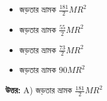 \documentclass[12pt, a4paper]{article}
\begin{document}
\begin{itemize}[label={}, leftmargin=1cm, itemsep=0.5em]
    \item[\textbf{A)}] জড়তার ভ্রামক $\frac{181}{2} M R^2$
    \item[\textbf{B)}] জড়তার ভ্রামক $\frac{55}{2} M R^2$
    \item[\textbf{C)}] জড়তার ভ্রামক $\frac{73}{2} M R^2$
    \item[\textbf{D)}] জড়তার ভ্রামক $90 M R^2$
\end{itemize}

\vspace{0.5em}
\begin{tcolorbox}[answerbox]
    \textbf{\color{success} উত্তর:} A) জড়তার ভ্রামক $\frac{181}{2} M R^2$
\end{tcolorbox}
\vspace{1em}
\end{document}

